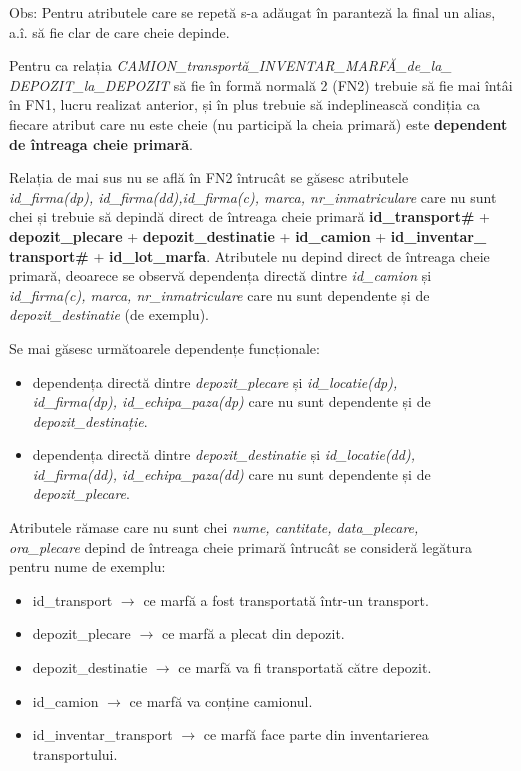 \documentclass[12pt, a4paper]{article}
\begin{document}
Obs: Pentru atributele care se repetă s-a adăugat în paranteză la final un alias, a.î. să fie clar de care cheie depinde.

Pentru ca relația \emph{CAMION\_transportă\_INVENTAR\_MARFĂ\_de\_la\_\\DEPOZIT\_la\_DEPOZIT} să fie în formă normală 2 (FN2) trebuie să fie mai întâi în FN1, lucru realizat anterior, și în plus trebuie să indeplinească condiția ca fiecare atribut care nu este cheie (nu participă la cheia primară) este \textbf{dependent de întreaga cheie primară}.

Relația de mai sus nu se află în FN2 întrucât se găsesc atributele \\\emph{id\_firma(dp), id\_firma(dd),id\_firma(c), marca, nr\_inmatriculare} care nu sunt chei și trebuie să depindă direct de întreaga cheie primară \textbf{id\_transport\#} + \textbf{depozit\_plecare} + \textbf{depozit\_destinatie} + \textbf{id\_camion} + \textbf{id\_inventar\_\\transport\#} + \textbf{id\_lot\_marfa}.
Atributele nu depind direct de întreaga cheie primară, deoarece se observă dependența directă dintre \emph{id\_camion} și \\\emph{id\_firma(c), marca, nr\_inmatriculare} care nu sunt dependente și de \\\emph{depozit\_destinatie} (de exemplu).

Se mai găsesc următoarele dependențe funcționale:
\begin{itemize}
    \item dependența directă dintre \emph{depozit\_plecare} și \emph{id\_locatie(dp), \\id\_firma(dp), id\_echipa\_paza(dp)} care nu sunt dependente și de \\\emph{depozit\_destinație}.
    \item dependența directă dintre \emph{depozit\_destinatie} și \emph{id\_locatie(dd), \\id\_firma(dd), id\_echipa\_paza(dd)} care nu sunt dependente și de \\\emph{depozit\_plecare}.
\end{itemize}

Atributele rămase care nu sunt chei \emph{nume, cantitate, data\_plecare, \\ora\_plecare} depind de întreaga cheie primară întrucât se consideră legătura pentru nume de exemplu:
\begin{itemize}
    \item id\_transport $\rightarrow$ ce marfă a fost transportată într-un transport.
    \item depozit\_plecare $\rightarrow$ ce marfă a plecat din depozit.
    \item depozit\_destinatie $\rightarrow$ ce marfă va fi transportată către depozit.
    \item id\_camion $\rightarrow$ ce marfă va conține camionul.
    \item id\_inventar\_transport $\rightarrow$ ce marfă face parte din inventarierea transportului.
\end{itemize}
\end{document}
